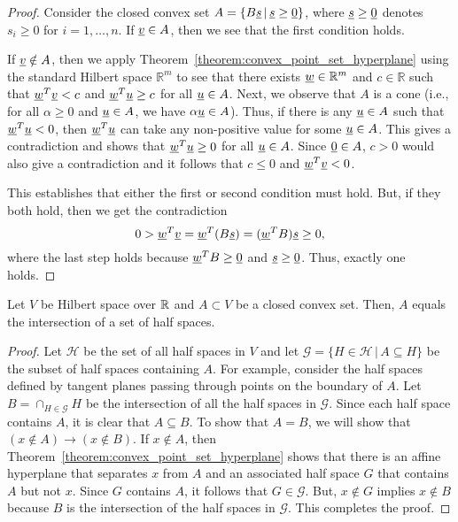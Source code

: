 \begin{proof}
Consider the closed convex set $A = \{B \underline{s} \, | \, \underline{s} \geq \underline{0} \}$, where $\underline{s} \geq \underline{0}$ denotes $s_i \geq 0$ for $i=1,\ldots,n$.
If $\underline{v} \in A$, then we see that the first condition holds.

If $\underline{v} \notin A$, then we apply Theorem~\ref{theorem:convex_point_set_hyperplane} using the standard Hilbert space $\mathbb{R}^m$ to see that there exists $\underline{w} \in \mathbb{R}^m$ and $c\in \mathbb{R}$ such that $\underline{w}^T \underline{v} < c$ and $\underline{w}^T \underline{u} \geq c$ for all $\underline{u} \in A$.
Next, we observe that $A$ is a cone (i.e., for all $\alpha \geq 0$ and $\underline{u} \in A$, we have $\alpha \underline{u} \in A$).
Thus, if there is any $\underline{u} \in A$ such that $\underline{w}^T \underline{u} < 0$,
then $\underline{w}^T \underline{u}$ can take any non-positive value for some $\underline{u} \in A$.
This gives a contradiction and shows that $\underline{w}^T \underline{u} \geq 0$ for all $\underline{u} \in A$.
Since $\underline{0} \in A$, $c>0$ would also give a contradiction and it follows that $c \leq 0$ and $\underline{w}^T \underline{v} < 0$.

This establishes that either the first or second condition must hold.
But, if they both hold, then we get the contradiction
\[ 0 > \underline{w}^T \underline{v} = \underline{w}^T (B \underline{s}) = (\underline{w}^T B) \underline{s} \geq 0, \]
where the last step holds because $\underline{w}^T B \geq \underline{0}$ and $\underline{s} \geq \underline{0}$.
Thus, exactly one holds.
\end{proof}

\begin{theorem}
Let $V$ be Hilbert space over $\mathbb{R}$ and $A \subset V$ be a closed convex set.
Then, $A$ equals the intersection of a set of half spaces.
\end{theorem}

\begin{proof}
Let $\mathcal{H}$ be the set of all half spaces in $V$ and let $\mathcal{G} = \{ H\in \mathcal{H} \,|\, A \subseteq H \}$  be the subset of half spaces containing $A$.
For example, consider the half spaces defined by tangent planes passing through points on the boundary of $A$.
Let $B= \cap_{H\in \mathcal{G}} H$ be the intersection of all the half spaces in $\mathcal{G}$.
Since each half space contains $A$, it is clear that $A\subseteq B$.
To show that $A = B$, we will show that $(x\notin A) \to (x\notin B)$.
If $x \notin A$, then Theorem~\ref{theorem:convex_point_set_hyperplane} shows that there is an affine hyperplane that separates $x$ from $A$ and an associated half space $G$ that contains $A$ but not $x$.
Since $G$ contains $A$, it follows that $G \in \mathcal{G}$.
But, $x \notin G$ implies $x \notin B$ because $B$ is the intersection of the half spaces in $\mathcal{G}$. 
This completes the proof.
\end{proof}

